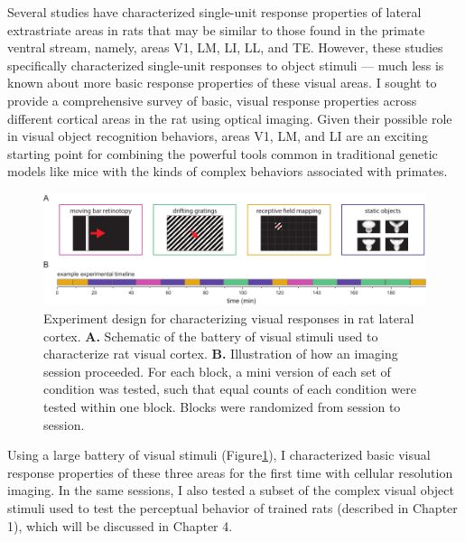 Several studies have characterized single-unit response properties of lateral extrastriate areas in rats that may be similar to those found in the primate ventral stream\cite{Tafazoli2017, Vermaercke2014, Vermaercke2015}, namely, areas V1, LM, LI, LL, and TE. However, these studies specifically characterized single-unit responses to object stimuli --- much less is known about more basic response properties of these visual areas. I sought to provide a comprehensive survey of basic, visual response properties across different cortical areas in the rat using optical imaging. Given their possible role in visual object recognition behaviors, areas V1, LM, and LI are an exciting starting point for combining the powerful tools common in traditional genetic models like mice with the kinds of complex behaviors associated with primates.  

\begin{figure}
    \includegraphics[width=\textwidth]{figures/chapter_3/fig_3-1_experiment_design/fig_3-1_experiment_design.pdf}
    \vspace{.1in}
    \caption[Experiment design]{Experiment design for characterizing visual responses in rat lateral cortex. 
    \textbf{A.} Schematic of the battery of visual stimuli used to characterize rat visual cortex. 
    \textbf{B.} Illustration of how an imaging session proceeded. For each block, a mini version of each set of condition was tested, such that equal counts of each condition were tested within one block. Blocks were randomized from session to session. 
    \label{fig:experiment_design}}
\end{figure}

Using a large battery of visual stimuli (Figure\ref{fig:experiment_design}), I characterized basic visual response properties of these three areas for the first time with cellular resolution imaging. In the same sessions, I also tested a subset of the complex visual object stimuli used to test the perceptual behavior of trained rats (described in Chapter 1), which will be discussed in Chapter 4. 


